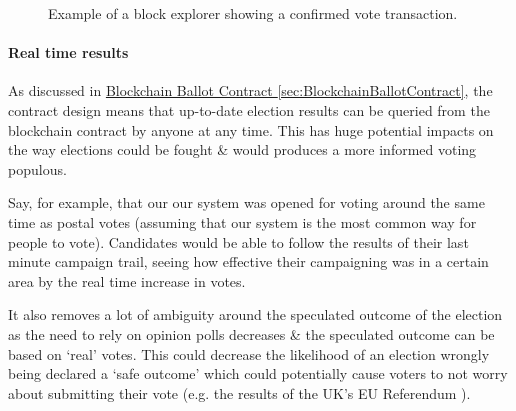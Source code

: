 \documentclass{article}
\begin{document}
\begin{figure}[h]
	\noindent
	\caption{Example of a block explorer showing a confirmed vote transaction.}
\end{figure}

\cleardoublepage

\paragraph{Real time results}
\hfill \break
As discussed in \hyperref[sec:BlockchainBallotContract]{Blockchain Ballot Contract \ref*{sec:BlockchainBallotContract}}, the contract design means that up-to-date election results can be queried from the blockchain contract by anyone at any time. This has huge potential impacts on the way elections could be fought \& would produces a more informed voting populous.

Say, for example, that our our system was opened for voting around the same time as postal votes (assuming that our system is the most common way for people to vote). Candidates would be able to follow the results of their last minute campaign trail, seeing how effective their campaigning was in a certain area by the real time increase in votes.

It also removes a lot of ambiguity around the speculated outcome of the election as the need to rely on opinion polls decreases \& the speculated outcome can be based on `real' votes. This could decrease the likelihood of an election wrongly being declared a `safe outcome' which could potentially cause voters to not worry about submitting their vote (e.g. the results of the UK's EU Referendum \citep{68_curtice_2017}).
\end{document}
